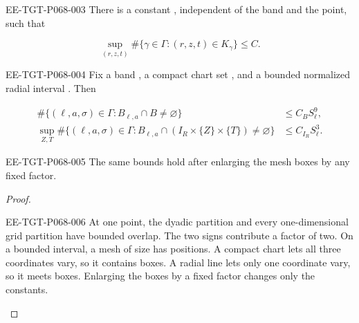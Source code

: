 \begin{lemma}\label{lem:6.3}
\begin{EESegment}{EE-TGT-P068-003}
There is a constant , independent of the band and the point, such that
\end{EESegment}
\[
  \sup_{(r,z,t)}\#\{\gamma\in\Gamma:(r,z,t)\in K_\gamma\}\le C.
\]
\begin{EESegment}{EE-TGT-P068-004}
Fix a band , a compact chart set , and a bounded normalized radial interval . Then
\end{EESegment}
\[
  \begin{aligned}
    \#\{(\ell,a,\sigma)\in\Gamma:B_{\ell,a}\cap B\ne\varnothing\}
      &\le C_BS_\ell^9,\\
    \sup_{Z,T}\#\{(\ell,a,\sigma)\in\Gamma:
      B_{\ell,a}\cap(I_R\times\{Z\}\times\{T\})\ne\varnothing\}
      &\le C_{I_R}S_\ell^3.
  \end{aligned}
\]
\begin{EESegment}{EE-TGT-P068-005}
The same bounds hold after enlarging the mesh boxes by any fixed factor.
\end{EESegment}
\end{lemma}

\begin{proof}
\begin{EESegment}{EE-TGT-P068-006}
At one point, the dyadic partition and every one-dimensional grid partition have bounded overlap. The two signs contribute a factor of two. On a bounded interval, a mesh of size  has  positions. A compact chart lets all three coordinates vary, so it contains  boxes. A radial line lets only one coordinate vary, so it meets  boxes. Enlarging the boxes by a fixed factor changes only the constants.
\end{EESegment}
\end{proof}

